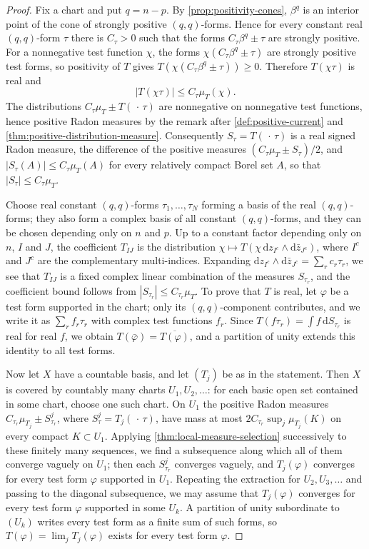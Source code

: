 \begin{proof}
Fix a chart and put $q=n-p$. By \cref{prop:positivity-cones}, $\beta^q$ is an interior point of the cone of strongly positive $(q,q)$-forms. Hence for every constant real $(q,q)$-form $\tau$ there is $C_\tau>0$ such that the forms $C_\tau\beta^q\pm\tau$ are strongly positive. For a nonnegative test function $\chi$, the forms $\chi(C_\tau\beta^q\pm\tau)$ are strongly positive test forms, so positivity of $T$ gives $T(\chi(C_\tau\beta^q\pm\tau))\geq0$. Therefore $T(\chi\tau)$ is real and
\[
 |T(\chi\tau)|\le C_\tau\mu_T(\chi).
\]
The distributions $C_\tau\mu_T\pm T(\,\cdot\,\tau)$ are nonnegative on nonnegative test functions, hence positive Radon measures by the remark after \cref{def:positive-current} and \cref{thm:positive-distribution-measure}. Consequently $S_\tau=T(\,\cdot\,\tau)$ is a real signed Radon measure, the difference of the positive measures $(C_\tau\mu_T\pm S_\tau)/2$, and $|S_\tau(A)|\leq C_\tau\mu_T(A)$ for every relatively compact Borel set $A$, so that $|S_\tau|\leq C_\tau\mu_T$.

Choose real constant $(q,q)$-forms $\tau_1,\ldots,\tau_N$ forming a basis of the real $(q,q)$-forms; they also form a complex basis of all constant $(q,q)$-forms, and they can be chosen depending only on $n$ and $p$. Up to a constant factor depending only on $n$, $I$ and $J$, the coefficient $T_{IJ}$ is the distribution $\chi\mapsto T(\chi\,\mathrm dz_{I^c}\wedge\mathrm d\bar z_{J^c})$, where $I^c$ and $J^c$ are the complementary multi-indices. Expanding $\mathrm dz_{I^c}\wedge\mathrm d\bar z_{J^c}=\sum_rc_r\tau_r$, we see that $T_{IJ}$ is a fixed complex linear combination of the measures $S_{\tau_r}$, and the coefficient bound follows from $|S_{\tau_r}|\leq C_{\tau_r}\mu_T$. To prove that $T$ is real, let $\varphi$ be a test form supported in the chart; only its $(q,q)$-component contributes, and we write it as $\sum_rf_r\tau_r$ with complex test functions $f_r$. Since $T(f\tau_r)=\int f\,\mathrm dS_{\tau_r}$ is real for real $f$, we obtain $T(\bar\varphi)=\overline{T(\varphi)}$, and a partition of unity extends this identity to all test forms.

Now let $X$ have a countable basis, and let $(T_j)$ be as in the statement. Then $X$ is covered by countably many charts $U_1,U_2,\ldots$: for each basic open set contained in some chart, choose one such chart. On $U_1$ the positive Radon measures $C_{\tau_r}\mu_{T_j}\pm S^j_{\tau_r}$, where $S^j_\tau=T_j(\,\cdot\,\tau)$, have mass at most $2C_{\tau_r}\sup_j\mu_{T_j}(K)$ on every compact $K\subset U_1$. Applying \cref{thm:local-measure-selection} successively to these finitely many sequences, we find a subsequence along which all of them converge vaguely on $U_1$; then each $S^j_{\tau_r}$ converges vaguely, and $T_j(\varphi)$ converges for every test form $\varphi$ supported in $U_1$. Repeating the extraction for $U_2,U_3,\ldots$ and passing to the diagonal subsequence, we may assume that $T_j(\varphi)$ converges for every test form $\varphi$ supported in some $U_k$. A partition of unity subordinate to $(U_k)$ writes every test form as a finite sum of such forms, so $T(\varphi)=\lim_jT_j(\varphi)$ exists for every test form $\varphi$.


\end{proof}
